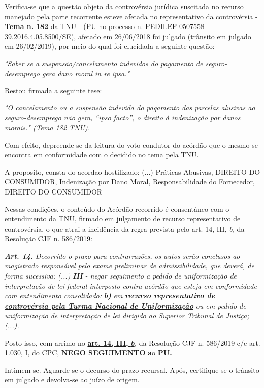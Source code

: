 \documentclass[12pt]{article}
\begin{document}
\justifying
\noindent Verifica-se que a questão objeto da controvérsia jurídica suscitada no recurso manejado pela parte recorrente esteve afetada no representativo da controvérsia - \textbf{Tema n. }\textbf{182} da TNU - (PU no processo n. PEDILEF 0507558-39.2016.4.05.8500/SE),  afetado em 26/06/2018 foi julgado (trânsito em julgado em 26/02/2019), por meio do qual foi elucidada a seguinte questão:

\noindent \textit{"Saber se a suspensão/cancelamento indevidos do pagamento de seguro-desemprego gera dano moral in re ipsa."}

\noindent Restou firmada a seguinte tese:

\noindent \textit{"O cancelamento ou a suspensão indevida do pagamento das parcelas alusivas ao seguro-desemprego não gera, “ipso facto”, o direito à indenização por danos morais." (Tema 182 TNU).}

\noindent Com efeito, depreende-se da leitura do voto condutor do acórdão que o mesmo se encontra em conformidade com o decidido no  tema pela TNU.

\noindent A proposito, consta do acordao hostilizado: (...) Práticas Abusivas, DIREITO DO CONSUMIDOR, Indenização por Dano Moral, Responsabilidade do Fornecedor, DIREITO DO CONSUMIDOR

\noindent Nessas condições, o conteúdo do Acórdão recorrido é consentâneo com o entendimento da TNU, firmado em julgamento de recurso representativo de controvérsia, o que atrai a incidência da regra prevista pelo art. 14, III, \textit{b,} da Resolução CJF n. 586/2019:

\noindent \textit{\textbf{Art. 14.}}\textit{ Decorrido o prazo para contrarrazões, os autos serão conclusos ao magistrado responsável pelo exame preliminar de admissibilidade, que deverá, de forma sucessiva: (...) }\textit{\textbf{III }}\textit{- negar seguimento a pedido de uniformização de interpretação de lei federal interposto contra acórdão que esteja em conformidade com entendimento consolidado: }\textit{\textbf{b)}}\textit{ em }\uline{\textit{\textbf{recurso representativo de controvérsia pela Turma Nacional de Uniformização}}}\textit{ ou em pedido de uniformização de interpretação de lei dirigido ao Superior Tribunal de Justiça;(...).}

\noindent Posto isso, com arrimo no \uline{\textbf{art. 14, III, }}\uline{\textit{\textbf{b}}}\textit{,} da Resolução CJF n. 586/2019 c/c art. 1.030, I, do CPC, \textbf{NEGO SEGUIMENTO }\textbf{a}o\textbf{ PU}\textbf{.}

\noindent Intimem-se. Aguarde-se o decurso do prazo recursal. Após, certifique-se o trânsito em julgado e devolva-se ao juízo de origem.
\end{document}
